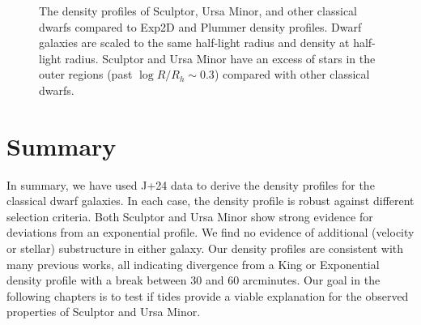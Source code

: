 \begin{figure}
\centering
{}
\caption[Classical dwarf density profiles]{The density profiles of
Sculptor, Ursa Minor, and other classical dwarfs compared to Exp2D and
Plummer density profiles. Dwarf galaxies are scaled to the same
half-light radius and density at half-light radius. Sculptor and Ursa
Minor have an excess of stars in the outer regions (past
\(\log R/R_h \sim 0.3\)) compared with other classical
dwarfs.}\label{fig:classical_dwarfs_densities}
\end{figure}

\section{Summary}\label{summary}

In summary, we have used J+24 data to derive the density profiles for
the classical dwarf galaxies. In each case, the density profile is
robust against different selection criteria. Both Sculptor and Ursa
Minor show strong evidence for deviations from an exponential profile.
We find no evidence of additional (velocity or stellar) substructure in
either galaxy. Our density profiles are consistent with many previous
works, all indicating divergence from a King or Exponential density
profile with a break between 30 and 60 arcminutes. Our goal in the
following chapters is to test if tides provide a viable explanation for
the observed properties of Sculptor and Ursa Minor.

